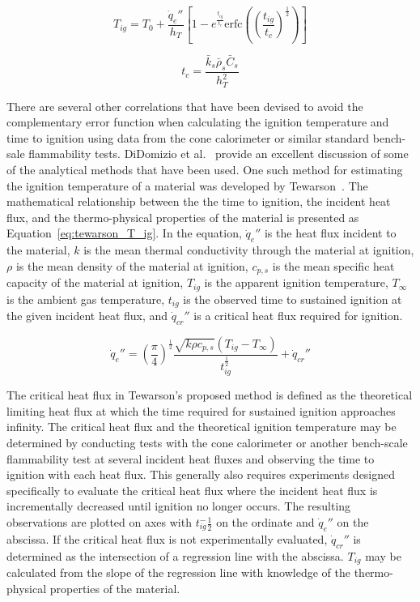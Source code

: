 \documentclass[12pt,oneside]{book}
\begin{document}
\begin{equation}
T_{ig} = T_0+\frac{\dot{q}_e''}{h_T}\left[1-e^{\frac{t_{ig}}{t_c}}\text{erfc}\left(\left(\frac{t_{ig}}{t_c}\right)^{\frac{1}{2}}\right)\right]  \label{eq:torero_T_ig}
\end{equation}

\begin{equation}
t_c = \frac{\bar{k}_s\bar{\rho}_s\bar{C}_s}{h_T^2}  \label{eq:torero_t_c}
\end{equation}

There are several other correlations that have been devised to avoid the complementary error function when calculating the ignition temperature and time to ignition using data from the cone calorimeter or similar standard bench-sale flammability tests. DiDomizio et al.~\cite{DiDomizio_2016} provide an excellent discussion of some of the analytical methods that have been used. One such method for estimating the ignition temperature of a material was developed by Tewarson~\cite{Tewarson_2000}. The mathematical relationship between the the time to ignition, the incident heat flux, and the thermo-physical properties of the material is presented as Equation~\ref{eq:tewarson_T_ig}. In the equation, $\dot{q}_e''$ is the heat flux incident to the material, $k$ is the mean thermal conductivity through the material at ignition, $\rho$ is the mean density of the material at ignition, $c_{p,s}$ is the mean specific heat capacity of the material at ignition, $T_{ig}$ is the apparent ignition temperature, $T_\infty$ is the ambient gas temperature, $t_{ig}$ is the observed time to sustained ignition at the given incident heat flux, and $\dot{q}_{cr}''$ is a critical heat flux required for ignition.

\begin{equation}
\dot{q}_e'' = \left(\frac{\pi}{4}\right)^{\frac{1}{2}}\frac{\sqrt{k\rho{c_{p,s}}}(T_{ig}-T_\infty)}{t_{ig}^\frac{1}{2}}+\dot{q}_{cr}''  \label{eq:tewarson_T_ig}
\end{equation}

The critical heat flux in Tewarson's proposed method is defined as the theoretical limiting heat flux at which the time required for sustained ignition approaches infinity. The critical heat flux and the theoretical ignition temperature may be determined by conducting tests with the cone calorimeter or another bench-scale flammability test at several incident heat fluxes and observing the time to ignition with each heat flux. This generally also requires experiments designed specifically to evaluate the critical heat flux where the incident heat flux is incrementally decreased until ignition no longer occurs. The resulting observations are plotted on axes with $t_{ig}^-\frac{1}{2}$ on the ordinate and $\dot{q}_e''$ on the abscissa. If the critical heat flux is not experimentally evaluated, $\dot{q}_{cr}''$ is determined as the intersection of a regression line with the abscissa. $T_{ig}$ may be calculated from the slope of the regression line with knowledge of the thermo-physical properties of the material.
\end{document}
